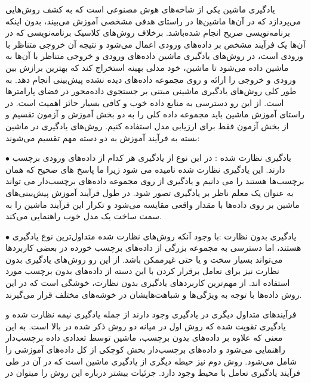 یادگیری ماشین یکی از شاخه‌های هوش مصنوعی است که به کشف روش‌هایی می‌پردازد که در آن‌ها ماشین‌ها در راستای هدفی مشخصی آموزش می‌بیند، بدون اینکه برنامه‌نویسی صریح انجام شده‌باشد. برخلاف روش‌های کلاسیک برنامه‌‌نویسی که در آن‌ها یک فرآیند مشخص بر داده‌های ورودی اعمال می‌شود و نتیجه آن خروجی متناظر با ورودی است، در روش‌های یادگیری ماشین داده‌های ورودی و خروجی متناظر با آن‌ها به ماشین داده می‌شود تا ماشین، خود مدلی بهینه استخراج کند که بهترین برازش بین ورودی و خروجی را ارائه و روی مجموعه داده‌های دیده نشده پیش‌بینی انجام دهد. به طور کلی روش‌های یادگیری ماشینی مبتنی بر جستجوی داده‌محور
در فضای پارامترها است. از این رو دسترسی به منابع داده خوب و کافی بسیار حائز اهمیت است. در راستای آموزش ماشین باید مجموعه داده کلی را به دو بخش آموزش و آزمون تقسیم و از بخش آزمون فقط برای ارزیابی مدل استفاده کنیم.  
روش‌های یادگیری در ماشین بسته به فرآیند آموزش به دو دسته مهم تقسیم می‌شوند:
\par
$\bullet$
یادگیری نظارت ‌شده 
: در این نوع از یادگیری هر کدام از داده‌های ورودی برچسب دارند. این یادگیری نظارت شده نامیده می شود زیرا ما پاسخ های صحیح که همان برچسب‌ها هستند را می دانیم و یادگیری از روی مجموعه داده‌های برچسب‌دار می تواند به عنوان یک معلم ناظر بر یادگیری تصور شود. در طول فرآیند آموزش پیش‌بینی‌های ماشین بر روی داده‌ها با مقدار واقعی مقایسه می‌شود و تکرار این فرآیند ماشین را به سمت ساخت یک مدل خوب راهنمایی می‌کند.
\par
$\bullet$
یادگیری بدون نظارت 
:با وجود آنکه روش‌های نظارت شده متداول‌ترین نوع یادگیری هستند، اما دسترسی به مجموعه بزرگی از داده‌های برچسب خورده در بعضی کاربردها می‌تواند بسیار سخت و یا حتی غیرممکن باشد. از این رو روش‌های یادگیری بدون نظارت نیز برای تعامل برقرار کردن با این دسته از داده‌های بدون برچسب مورد استفاده اند. از مهم‌ترین کاربردهای یادگیری بدون نظارت، خوشگی
است که در این روش داده‌ها با توجه به ویژگی‌ها و شباهت‌هایشان در خوشه‌های مختلف قرار می‌گیرند.
\par
فرآیندهای متداول دیگری در یادگیری وجود دارند از جمله یادگیری نیمه‌ نظارت شده
و یادگیری تقویت شده
که روش اول در میانه دو روش ذکر شده در بالا است. به این معنی که علاوه بر داده‌های بدون برچسب، ماشین توسط تعدادی داده برچسب‌دار راهنمایی می‌شود و داده‌های برچسب‌دار بخش کوچکی از کل داده‌های آموزشی را شامل می‌شود. روش دوم نیز حیطه دیگری از یادگیری ماشین است که در آن در طی فرآیند یادگیری تعامل با محیط وجود دارد. جزئیات بیشتر درباره این روش را میتوان در 
